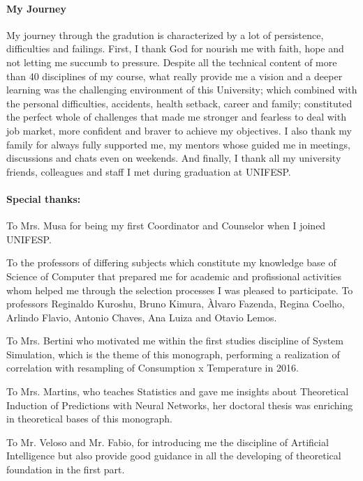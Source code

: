    \begin{agradecimentos}
        \paragraph{My Journey}
            My journey through the gradution is characterized by a lot of persistence, difficulties and failings. First, I thank God for nourish me with faith, hope and not letting me succumb to pressure. Despite all the technical content of more than 40 disciplines of my course, what really provide me a vision and a deeper learning was the challenging environment of this University; which combined with the personal difficulties, accidents, health setback, career and family; constituted the perfect whole of challenges that made me stronger and fearless to deal with job market, more confident and braver to achieve my objectives. I also thank my family for always fully supported me, my mentors whose guided me in meetings, discussions and chats even on weekends. And finally, I thank all my university friends, colleagues and staff I met during graduation at UNIFESP.
            
            \paragraph{Special thanks:}
                
            To Mrs. Musa for being my first Coordinator and Counselor when I joined UNIFESP.
            
            To the professors of differing subjects which constitute my knowledge base of Science of Computer that prepared me for academic and profissional activities whom helped me through the selection processes I was pleased to participate. To professors Reginaldo Kuroshu, Bruno Kimura, Àlvaro Fazenda, Regina Coelho, Arlindo Flavio, Antonio Chaves, Ana Luiza and Otavio Lemos.
            
            To Mrs. Bertini who motivated me within the first studies discipline of System Simulation, which is the theme of this monograph, performing a realization of correlation with resampling of Consumption x Temperature in 2016.
            
            To Mrs. Martins, who teaches Statistics and gave me insights about Theoretical Induction of Predictions with Neural Networks, her doctoral thesis was enriching in theoretical bases of this monograph.
            
            To Mr. Veloso and Mr. Fabio, for introducing me the discipline of Artificial Intelligence but also provide good guidance in all the developing of theoretical foundation in the first part.
            

\end{agradecimentos}
